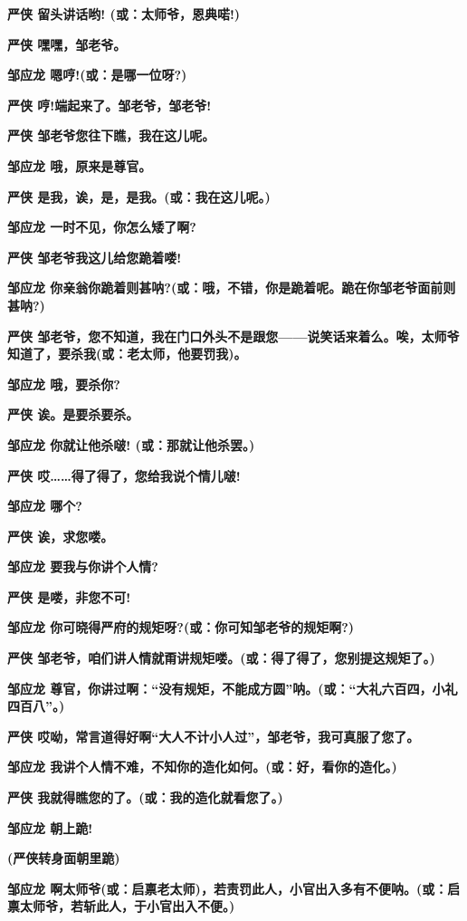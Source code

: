 \textbf{严侠 留头讲话哟! (或：太师爷，恩典喏!)}

\textbf{严侠 嘿嘿，邹老爷。}

\textbf{邹应龙 嗯哼!(或：是哪一位呀?)}

\textbf{严侠 哼!端起来了。邹老爷，邹老爷!}

\textbf{严侠 邹老爷您往下瞧，我在这儿呢。}

\textbf{邹应龙 哦，原来是尊官。}

\textbf{严侠 是我，诶，是，是我。(或：我在这儿呢。)}

\textbf{邹应龙 一时不见，你怎么矮了啊?}

\textbf{严侠 邹老爷我这儿给您跪着喽!}

\textbf{邹应龙
你亲翁你跪着则甚呐?(或：哦，不错，你是跪着呢。跪在你邹老爷面前则甚呐?)}

\textbf{严侠
邹老爷，您不知道，我在门口外头不是跟您------说笑话来着么。唉，太师爷知道了，要杀我(或：老太师，他要罚我)。}

\textbf{邹应龙 哦，要杀你?}

\textbf{严侠 诶。是要杀要杀。}

\textbf{邹应龙 你就让他杀啵! (或：那就让他杀罢。)}

\textbf{严侠 哎\ldots{}\ldots{}得了得了，您给我说个情儿啵!}

\textbf{邹应龙 哪个?}

\textbf{严侠 诶，求您喽。}

\textbf{邹应龙 要我与你讲个人情?}

\textbf{严侠 是喽，非您不可!}

\textbf{邹应龙 你可晓得严府的规矩呀?(或：你可知邹老爷的规矩啊?)}

\textbf{严侠
邹老爷，咱们讲人情就甭讲规矩喽。(或：得了得了，您别提这规矩了。)}

\textbf{邹应龙
尊官，你讲过啊：``没有规矩，不能成方圆''呐。(或：``大礼六百四，小礼四百八''。)}

\textbf{严侠
哎呦，常言道得好啊``大人不计小人过''，邹老爷，我可真服了您了。}

\textbf{邹应龙 我讲个人情不难，不知你的造化如何。(或：好，看你的造化。)}

\textbf{严侠 我就得瞧您的了。(或：我的造化就看您了。)}

\textbf{邹应龙 朝上跪!}

\textbf{(严侠转身面朝里跪)}

\textbf{邹应龙
啊太师爷(或：启禀老太师)，若责罚此人，小官出入多有不便呐。(或：启禀太师爷，若斩此人，于小官出入不便。)}

